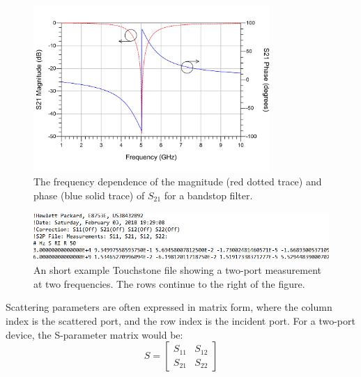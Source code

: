 \documentclass[../thesis/thesis.tex]{subfiles}
\begin{document}
\begin{refsection}
\begin{figure}
	\centering
	\includegraphics[width=0.8\textwidth]{ch2_filter}
	\caption[The frequency dependence of a bandstop filter.]{The frequency dependence of the magnitude (red dotted trace) and phase (blue solid trace) of $S_{21}$ for a bandstop filter.}
	\label{ch2_fig_filter}
\end{figure}

\begin{figure}
	\centering
	\includegraphics[width=\textwidth]{ch2_s2p}
	\caption[The Touchstone file layout.]{An short example Touchstone file showing a two-port measurement at two frequencies. The rows continue to the right of the figure.}
	\label{ch2_fig_s2p}
\end{figure}

Scattering parameters are often expressed in matrix form, where the column index is the scattered port, and the row index is the incident port. For a two-port device, the S-parameter matrix would be:
\begin{equation}
S=
\begin{bmatrix}
S_{11} & S_{12} \\
S_{21} & S_{22}
\end{bmatrix}
\end{equation}


\end{refsection}
\end{document}
